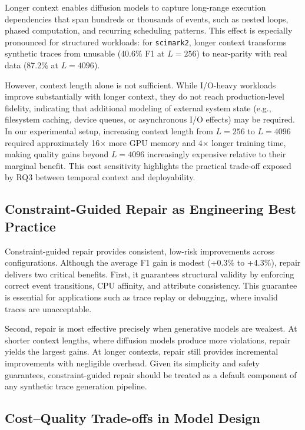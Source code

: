 Longer context enables diffusion models to capture long-range execution dependencies that span hundreds or thousands of events, such as nested loops, phased computation, and recurring scheduling patterns. This effect is especially pronounced for structured workloads: for \texttt{scimark2}, longer context transforms synthetic traces from unusable (40.6\% F1 at $L=256$) to near-parity with real data (87.2\% at $L=4096$).

However, context length alone is not sufficient. While I/O-heavy workloads improve substantially with longer context, they do not reach production-level fidelity, indicating that additional modeling of external system state (e.g., filesystem caching, device queues, or asynchronous I/O effects) may be required. In our experimental setup, increasing context length from $L=256$ to $L=4096$ required approximately 16$\times$ more GPU memory and 4$\times$ longer training time, making quality gains beyond $L=4096$ increasingly expensive relative to their marginal benefit. This cost sensitivity highlights the practical trade-off exposed by RQ3 between temporal context and deployability.




\subsection{Constraint-Guided Repair as Engineering Best Practice}

Constraint-guided repair provides consistent, low-risk improvements across configurations. Although the average F1 gain is modest (+0.3\% to +4.3\%), repair delivers two critical benefits. First, it guarantees structural validity by enforcing correct event transitions, CPU affinity, and attribute consistency. This guarantee is essential for applications such as trace replay or debugging, where invalid traces are unacceptable.

Second, repair is most effective precisely when generative models are weakest. At shorter context lengths, where diffusion models produce more violations, repair yields the largest gains. At longer contexts, repair still provides incremental improvements with negligible overhead. Given its simplicity and safety guarantees, constraint-guided repair should be treated as a default component of any synthetic trace generation pipeline.

\subsection{Cost--Quality Trade-offs in Model Design}

